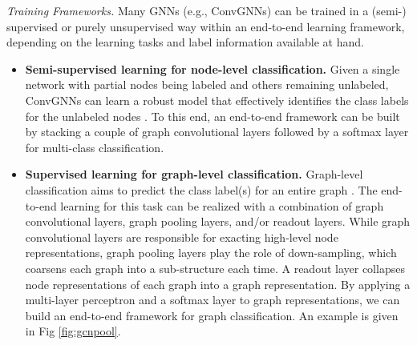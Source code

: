     \vspace{2mm}
    \textit{Training Frameworks.} Many GNNs (e.g., ConvGNNs) can be trained in a (semi-) supervised or purely unsupervised way within an end-to-end learning framework, depending on the learning tasks and label information available at hand.
    \begin{itemize}
        \item \textbf{Semi-supervised learning for node-level classification.} Given a single network with partial nodes being labeled and others remaining unlabeled, ConvGNNs can learn a robust model that effectively identifies the class labels for the unlabeled nodes \cite{kipf2017semi}. To this end, an end-to-end framework can be built by stacking a couple of graph convolutional layers followed by a softmax layer for multi-class classification. 
        
        
        \item \textbf{Supervised learning for graph-level classification.} Graph-level classification aims to predict the class label(s) for an entire graph \cite{zhang2018end,ying2018hierarchical,pan2016joint,pan2017task}. The end-to-end learning for this task can be realized with a combination of graph convolutional layers, graph pooling layers, and/or readout layers. While graph convolutional layers are responsible for exacting high-level node representations, graph pooling layers play the role of down-sampling, which coarsens each graph into a sub-structure each time. A readout layer collapses node representations of each graph into a graph representation. 
        By applying a multi-layer perceptron and a softmax layer to graph representations, we can build an end-to-end framework for graph classification. An example is given in Fig \ref{fig:gcnpool}.
        

\end{itemize}

